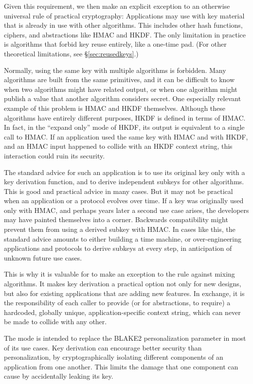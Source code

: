 \documentclass[11pt,notitlepage,a4paper]{article}
\newcommand{\flag}[1]{\texttt{\detokenize{#1}}\xspace}
\begin{document}
Given this requirement, we then make an explicit exception to an otherwise
universal rule of practical cryptography: Applications may use
\flag{derive_key} with key material that is already in use with other
algorithms. This includes other hash functions, ciphers, and abstractions like
HMAC and HKDF. The only limitation in practice is algorithms that forbid key
reuse entirely, like a one-time pad. (For other theoretical limitations, see
\S\ref{sec:reusedkeys}.)

Normally, using the same key with multiple algorithms is forbidden. Many
algorithms are built from the same primitives, and it can be difficult to know
when two algorithms might have related output, or when one algorithm might
publish a value that another algorithm considers secret. One especially
relevant example of this problem is HMAC and HKDF themselves. Although these
algorithms have entirely different purposes, HKDF is defined in terms of HMAC.
In fact, in the ``expand only'' mode of HKDF, its output is equivalent to a
single call to HMAC. If an application used the same key with HMAC and with
HKDF, and an HMAC input happened to collide with an HKDF context string, this
interaction could ruin its security.

The standard advice for such an application is to use its original key only
with a key derivation function, and to derive independent subkeys for other
algorithms. This is good and practical advice in many cases. But it may not be
practical when an application or a protocol evolves over time. If a key was
originally used only with HMAC, and perhaps years later a second use case
arises, the developers may have painted themselves into a corner. Backwards
compatibility might prevent them from using a derived subkey with HMAC. In
cases like this, the standard advice amounts to either building a time machine,
or over-engineering applications and protocols to derive subkeys at every step,
in anticipation of unknown future use cases.

This is why it is valuable for \flag{derive_key} to make an exception to the
rule against mixing algorithms. It makes key derivation a practical option not
only for new designs, but also for existing applications that are adding new
features. In exchange, it is the responsibility of each caller to provide (or
for abstractions, to require) a hardcoded, globally unique,
application-specific context string, which can never be made to collide with
any other.

The \flag{derive_key} mode is intended to replace the BLAKE2 personalization
parameter in most of its use cases. Key derivation can encourage better
security than personalization, by cryptographically isolating different
components of an application from one another. This limits the damage that one
component can cause by accidentally leaking its key.
\end{document}
